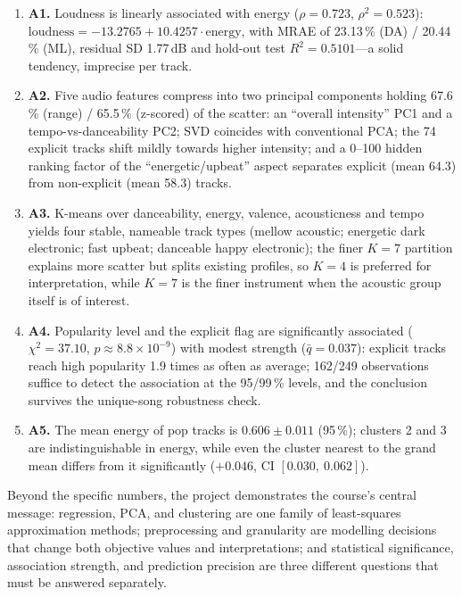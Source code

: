 \documentclass[11pt,letterpaper]{article}
\begin{document}
\begin{enumerate}
  \item \textbf{A1.} Loudness is linearly associated with energy
        ($\rho = 0.723$, $\rho^2 = 0.523$):
        $\mathrm{loudness} = -13.2765 + 10.4257\cdot\mathrm{energy}$, with
        MRAE of 23.13\,\% (DA) / 20.44\,\% (ML), residual SD 1.77\,dB and
        hold-out test $R^2 = 0.5101$---a solid tendency, imprecise per track.
  \item \textbf{A2.} Five audio features compress into two principal
        components holding 67.6\,\% (range) / 65.5\,\% (z-scored) of the
        scatter: an ``overall intensity'' PC1 and a tempo-vs-danceability
        PC2; SVD coincides with conventional PCA; the 74 explicit tracks
        shift mildly towards higher intensity; and a 0--100 hidden ranking
        factor of the ``energetic/upbeat'' aspect separates explicit (mean
        64.3) from non-explicit (mean 58.3) tracks.
  \item \textbf{A3.} K-means over danceability, energy, valence,
        acousticness and tempo yields four stable, nameable track types
        (mellow acoustic; energetic dark electronic; fast upbeat; danceable
        happy electronic); the finer $K=7$ partition explains more scatter
        but splits existing profiles, so $K=4$ is preferred for
        interpretation, while $K=7$ is the finer instrument when the acoustic
        group itself is of interest.
  \item \textbf{A4.} Popularity level and the explicit flag are significantly
        associated ($\chi^2 = 37.10$, $p\approx8.8\times10^{-9}$) with modest
        strength ($\bar q = 0.037$): explicit tracks reach high popularity
        1.9 times as often as average; 162/249 observations suffice to detect
        the association at the 95/99\,\% levels, and the conclusion survives
        the unique-song robustness check.
  \item \textbf{A5.} The mean energy of pop tracks is $0.606 \pm 0.011$
        (95\,\%); clusters 2 and 3 are indistinguishable in energy, while
        even the cluster nearest to the grand mean differs from it
        significantly ($+0.046$, CI $[0.030,\ 0.062]$).
\end{enumerate}

Beyond the specific numbers, the project demonstrates the course's central
message: regression, PCA, and clustering are one family of least-squares
approximation methods; preprocessing and granularity are modelling decisions
that change both objective values and interpretations; and statistical
significance, association strength, and prediction precision are three
different questions that must be answered separately.
\end{document}
